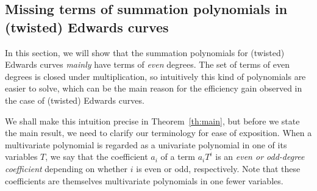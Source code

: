 %
%

\subsection{Missing terms of summation polynomials in (twisted) Edwards curves}
\label{sec:twisted-edwards-summation-polynomial}

%
%



In this section, we will show that the summation polynomials for
(twisted) Edwards curves \emph{mainly} have terms of \emph{even}
degrees.
%
The set of terms of even degrees is closed under multiplication, so
intuitively this kind of polynomials are easier to solve, which can be
the main reason for the efficiency gain observed in the case of
(twisted) Edwards curves.

We shall make this intuition precise in Theorem~\ref{th:main}, but
before we state the main result, we need to clarify our terminology
for ease of exposition.
%
When a multivariate polynomial is regarded as a univariate polynomial
in one of its variables $T$, we say that the coefficient $a_i$ of a
term $a_iT^i$ is an \emph{even or odd-degree coefficient} depending on
whether $i$ is even or odd, respectively.
%
Note that these coefficients are themselves multivariate polynomials
in one fewer variables.

